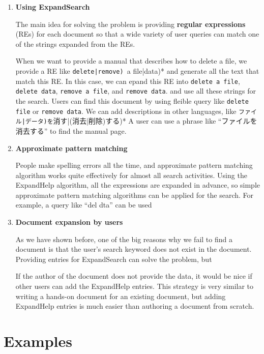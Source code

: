\documentclass[manuscript,screen,review]{acmart}
\begin{document}
\begin{enumerate}
  
\item \textbf{Using ExpandSearch}
  
  The main idea for solving the problem is 
  providing \textbf{regular expressions} (REs)
  for  each document so that a wide variety of user queries can match one of the
  strings expanded from the REs.
  
  When we want to provide a manual that describes how to delete a file, 
  we provide a RE like \verb*(delete|remove) (a file|data)*
  and generate all the text that match this RE.
  In this case, we can epand this RE into
  \verb|delete a file|,
  \verb|delete data|,
  \verb|remove a file|, and
  \verb|remove data|.
  and use all these strings for the search.
  Users can find this document by using fleible query like
  \verb|delete file| or
  \verb|remove data|.
  We can add descriptions in other languages, like \verb*(ファイル|データ)を(消す|(消去|削除)する)*
  A user can use a phrase like ``ファイルを消去する'' to find the manual page.

\item \textbf{Approximate pattern matching}

  People make spelling errors all the time, and approximate pattern matching algorithm
  works quite effectively for almost all search activities.
  Using the ExpandHelp algorithm, all the expressions are expanded in advance,
  so simple approximate pattern matching algorithms can be applied for the search.
  For example, a query like ``del dta'' can be used

\item \textbf{Document expansion by users}

  As we have shown before, one of the big reasons why we fail to find a document is that
  the user's search keyword does not exist in the document.
  Providing entries for ExpandSearch can solve the problem, but
  
  If the author of the document does not provide the data, it would be nice if
  other users can add the ExpandHelp entries.
  This strategy is very similar to writing a hands-on document for an existing document,
  but adding ExpandHelp entries is much easier than authoring  a document from scratch.

\end{enumerate}

\section{Examples}
\end{document}
